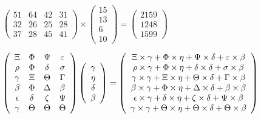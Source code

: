 \documentclass[12pt]{article}
\begin{document}
 

 
$\left( \begin{array}{ccccccccccccccc}
 51  & 
 64  & 
 42  & 
 31  \\ 
 32  & 
 26  & 
 25  & 
 28  \\ 
 37  & 
 28  & 
 45  & 
 41
\end{array}\right) \times
\left( \begin{array}{c}
 15  \\ 
 13  \\ 
 6  \\ 
 10
\end{array}\right)  =
\left( \begin{array}{c}
 2159  \\ 
 1248  \\ 
 1599
\end{array}\right)  $
 
$  %
 \left( \begin{array}
 {
 c
 c
 c
 c
 }
                    \Xi & 
 \Phi & 
 \Psi & 
 \varepsilon \\ 
 \rho & 
 \Phi & 
 \delta & 
 \sigma \\ 
 \gamma & 
                    \Xi & 
 \Theta & 
 \Gamma \\ 
 \beta & 
 \Phi & 
 \Delta & 
 \beta \\ 
 \epsilon & 
 \delta & 
                    \zeta & 
 \Psi \\ 
 \gamma & 
 \Theta & 
 \Theta & 
 \Theta
 \end{array} \right)
 \left( \begin{array}
 {
 c
 }
 \gamma \\ 
 \eta \\ 
 \delta \\ 
 \beta
 \end{array} \right)
=
  \left( \begin{array}
 {
 c
 }
                    \Xi \times  \gamma   +  \Phi \times  \eta   +  \Psi \times  \delta   +  \varepsilon \times  \beta \\ 
 \rho \times  \gamma   +  \Phi \times  \eta   +  \delta \times  \delta   +  \sigma \times  \beta \\ 
 \gamma \times  \gamma   +                     \Xi \times  \eta   +  \Theta \times  \delta   +  \Gamma \times  \beta \\ 
 \beta \times  \gamma   +  \Phi \times  \eta   +  \Delta \times  \delta   +  \beta \times  \beta \\ 
 \epsilon \times  \gamma   +  \delta \times  \eta   +                     \zeta \times  \delta   +  \Psi \times  \beta \\ 
 \gamma \times  \gamma   +  \Theta \times  \eta   +  \Theta \times  \delta   +  \Theta \times  \beta
 \end{array} \right)
$
 
\end{document}
